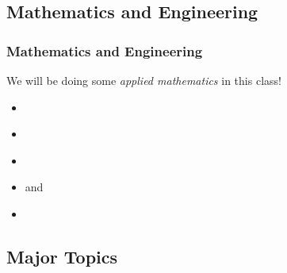 \documentclass[fleqn]{beamer} %
\newcommand{\sectionIsubsectionIIItitle}{Mathematics and Engineering}
\newcommand{\sectionIsubsectionIVtitle}{Major Topics}
\begin{document}
		\subsection{\sectionIsubsectionIIItitle}\label{sectionIsubsectionIII}
			\begin{frame} 
				\frametitle{\sectionIsubsectionIIItitle}
				\bigskip

				We will be doing some {\it applied mathematics} in this class!
				\begin{multicols}{2}
				\begin{itemize}
					\item \underline{\hspace{40mm}}\\
					\item \underline{\hspace{40mm}} \\
					\item \underline{\hspace{40mm}} \\
					\item \underline{\hspace{40mm}} and \underline{\hspace{40mm}} \\
					\item \underline{\hspace{40mm}} \\
				\end{itemize}
				\end{multicols} 

				\btVFill
			\end{frame}	

		\subsection{\sectionIsubsectionIVtitle}\label{sectionIsubsectionIV}	
\end{document}

